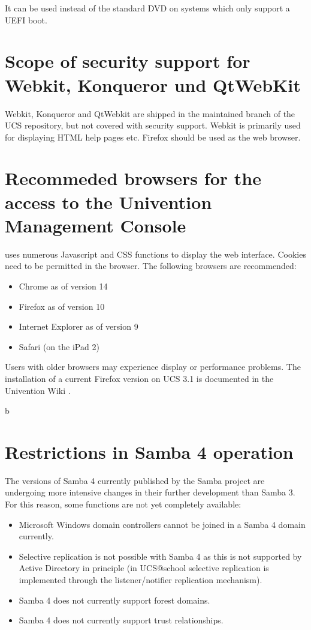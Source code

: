 It can be used instead of the standard DVD on systems which only
support a UEFI boot.

\section{Scope of security support for Webkit, Konqueror und QtWebKit}
Webkit, Konqueror and QtWebkit are shipped in the maintained branch of
the UCS repository, but not covered with security support. Webkit is
primarily used for displaying HTML help pages etc. Firefox should be
used as the web browser.

\section{Recommeded browsers for the access to the Univention Management Console}

\ucsUMC{} uses numerous Javascript and CSS functions to display the
web interface. Cookies need to be permitted in the browser.
The following browsers are recommended:

\begin{itemize}
\item Chrome as of version 14
\item Firefox as of version 10
\item Internet Explorer as of version 9
\item Safari (on the iPad 2)
\end{itemize}

Users with older browsers may experience display or performance
problems. The installation of a current Firefox version on UCS 3.1 is
documented in the Univention Wiki \cite{ucd-firefox7}.

b\section{Restrictions in Samba 4 operation}

The versions of Samba 4 currently published by the Samba project are
undergoing more intensive changes in their further
development than Samba 3. For this reason, some functions are not yet
completely available:

\begin{itemize}
\item Microsoft Windows domain controllers cannot be joined in a Samba
4 domain currently.
\item Selective replication is not possible with Samba 4 as this is
not supported by Active Directory in principle (in UCS@school
selective replication is implemented through the listener/notifier
replication mechanism).

\item Samba 4 does not currently support forest domains. 
\item Samba 4 does not currently support trust relationships.
\end{itemize}

